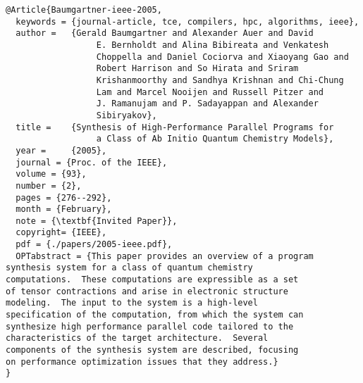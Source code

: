 \documentclass[11pt]{article}
\begin{document}
\begin{lstlisting}
@Article{Baumgartner-ieee-2005,
  keywords = {journal-article, tce, compilers, hpc, algorithms, ieee},
  author = 	 {Gerald Baumgartner and Alexander Auer and David
                  E. Bernholdt and Alina Bibireata and Venkatesh
                  Choppella and Daniel Cociorva and Xiaoyang Gao and
                  Robert Harrison and So Hirata and Sriram
                  Krishanmoorthy and Sandhya Krishnan and Chi-Chung
                  Lam and Marcel Nooijen and Russell Pitzer and
                  J. Ramanujam and P. Sadayappan and Alexander
                  Sibiryakov}, 
  title = 	 {Synthesis of High-Performance Parallel Programs for
                  a Class of Ab Initio Quantum Chemistry Models},
  year =	 {2005},
  journal = {Proc. of the IEEE},
  volume = {93},
  number = {2},
  pages = {276--292},
  month = {February},
  note = {\textbf{Invited Paper}},
  copyright= {IEEE},
  pdf = {./papers/2005-ieee.pdf},
  OPTabstract = {This paper provides an overview of a program
synthesis system for a class of quantum chemistry
computations.  These computations are expressible as a set
of tensor contractions and arise in electronic structure
modeling.  The input to the system is a high-level
specification of the computation, from which the system can
synthesize high performance parallel code tailored to the
characteristics of the target architecture.  Several
components of the synthesis system are described, focusing
on performance optimization issues that they address.}  
}


\end{lstlisting}
\end{document}
